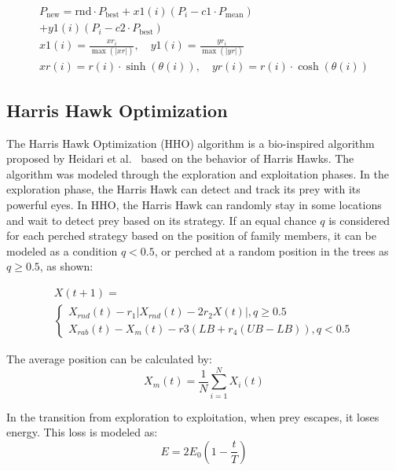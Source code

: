 \documentclass{elsarticle}
\begin{document}
\begin{equation}
\begin{gathered}
P_{\text{new}} = \text{rnd} \cdot P_{\text{best}} + x1(i)(P_{i}-c1 \cdot P_{\text{mean}}) \\
+ y1(i)(P_{i}-c2 \cdot P_{\text{best}}) \\
x1(i) = \frac{xr_{i}}{\max(\lvert xr \rvert)}, \quad y1(i) = \frac{yr_{i}}{\max(\lvert yr \rvert)} \\
xr(i) = r(i) \cdot \sinh(\theta(i)), \quad yr(i) = r(i) \cdot \cosh(\theta(i))
\end{gathered}
\end{equation}

\subsection{Harris Hawk Optimization}

\noindent The Harris Hawk Optimization (HHO) algorithm is a bio-inspired algorithm proposed by Heidari et al.~\cite{Heidari2019} based on the behavior of Harris Hawks. The algorithm was modeled through the exploration and exploitation phases. In the exploration phase, the Harris Hawk can detect and track its prey with its powerful eyes. In HHO, the Harris Hawk can randomly stay in some locations and wait to detect prey based on its strategy. If an equal chance $q$ is considered for each perched strategy based on the position of family members, it can be modeled as a condition $q<0.5$, or perched at a random position in the trees as $q\geq 0.5$, as shown:

\begin{equation}
\begin{gathered}
X(t+1)= \\
\begin{cases}
  X_{rnd}(t) - r_1 |X_{rnd}(t) -2 r_2 X(t)| , q \geq 0.5 \\
  X_{rab}(t) - X_m(t) - r3(LB + r_4 (UB-LB)) , q < 0.5
\end{cases}
\end{gathered}
\end{equation}

\noindent The average position can be calculated by:
\begin{equation}
X_m (t) = \frac{1}{N} \sum_{i=1}^{N} X_i(t) 
\label{eq14}
\end{equation}

\noindent In the transition from exploration to exploitation, when prey escapes, it loses energy. This loss is modeled as:
\begin{equation}
E = 2 E_0 (1 - \frac{t}{T}) 
\label{eq15}
\end{equation}
\end{document}
